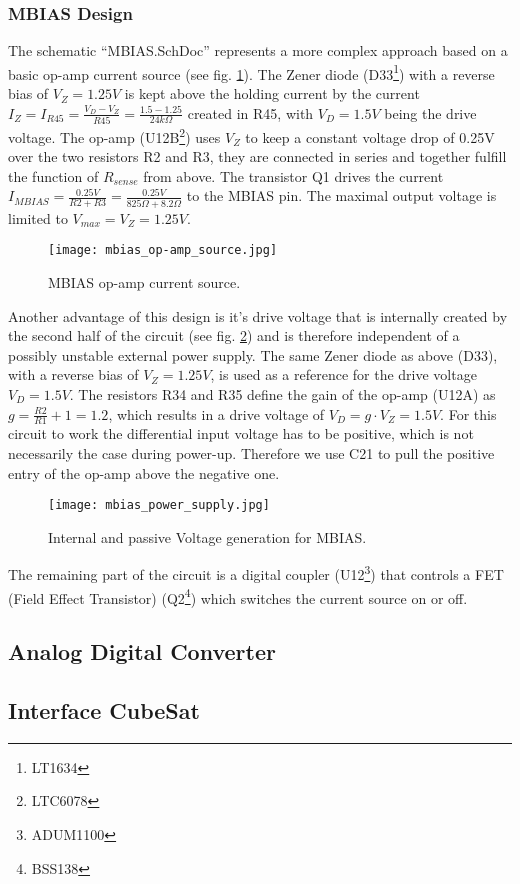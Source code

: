 \subsubsection{MBIAS Design}
\label{sec:mbias_design}
The schematic ``MBIAS.SchDoc'' represents a more complex approach based on a basic op-amp current source (see fig. \ref{fig:mbias_op-amp_source}).
The Zener diode (D33\footnote{LT1634}) with a reverse bias of $V_Z = 1.25V$ is kept above the holding current by the current $I_Z = I_{R45} = \frac{V_D-V_Z}{R45} = \frac{1.5-1.25}{24k\Omega}$ created in R45, with $V_D = 1.5V$ being the drive voltage.
The op-amp (U12B\footnote{LTC6078}) uses $V_Z$ to keep a constant voltage drop of 0.25V over the two resistors R2 and R3, they are connected in series and together fulfill the function of $R_{sense}$ from above.
The transistor Q1 drives the current $I_{MBIAS} = \frac{0.25V}{R2+R3} = \frac{0.25V}{825\Omega+8.2\Omega}$ to the MBIAS pin.
The maximal output voltage is limited to $V_{max} = V_Z = 1.25V$.
\begin{figure}[H]
    \centering
    \texttt{[image: mbias\_op-amp\_source.jpg]}
    \caption[MBIAS Op-amp Current Source]{MBIAS op-amp current source.}
    \label{fig:mbias_op-amp_source}
\end{figure}

Another advantage of this design is it's drive voltage that is internally created by the second half of the circuit (see fig. \ref{fig:mbias_power_supply}) and is therefore independent of a possibly unstable external power supply.
The same Zener diode as above (D33), with a reverse bias of $V_Z = 1.25V$, is used as a reference for the drive voltage $V_D = 1.5V$.
The resistors R34 and R35 define the gain of the op-amp (U12A) as $g = \frac{R2}{R1}+1 = 1.2$, which results in a drive voltage of $V_D = g\cdot V_Z = 1.5V$.
For this circuit to work the differential input voltage has to be positive, which is not necessarily the case during power-up.
Therefore we use C21 to pull the positive entry of the op-amp above the negative one.
\begin{figure}[H]
    \centering
    \texttt{[image: mbias\_power\_supply.jpg]}
    \caption[MBIAS Voltage Generation]{Internal and passive Voltage generation for MBIAS.}
    \label{fig:mbias_power_supply}
\end{figure}

The remaining part of the circuit is a digital coupler (U12\footnote{ADUM1100}) that controls a FET (Field Effect Transistor) (Q2\footnote{BSS138}) which switches the current source on or off.


\subsection{Analog Digital Converter}
\label{sec:adc}


\subsection{Interface CubeSat}
\label{sec:interface_cubesat}
